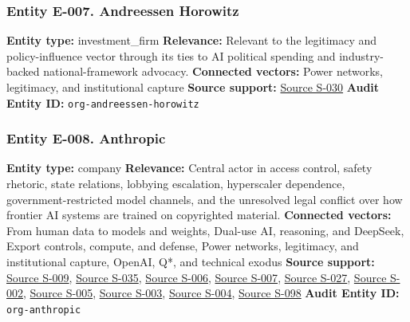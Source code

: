 \documentclass[
  american,
  11pt,
  letterpaper,
]{article}
\begin{document}
\subsubsection{Entity E-007. Andreessen
Horowitz}\label{entity-e-007-andreessen-horowitz}

\textbf{Entity type:} investment\_firm \textbf{Relevance:} Relevant to
the legitimacy and policy-influence vector through its ties to AI
political spending and industry-backed national-framework advocacy.
\textbf{Connected vectors:} Power networks, legitimacy, and
institutional capture \textbf{Source support:}
\hyperref[source-s-030-openai-linked-pac-doubles-down-in-kentucky]{Source
S-030} \textbf{Audit Entity ID:} \texttt{org-andreessen-horowitz}

\subsubsection{Entity E-008. Anthropic}\label{entity-e-008-anthropic}

\textbf{Entity type:} company \textbf{Relevance:} Central actor in
access control, safety rhetoric, state relations, lobbying escalation,
hyperscaler dependence, government-restricted model channels, and the
unresolved legal conflict over how frontier AI systems are trained on
copyrighted material. \textbf{Connected vectors:} From human data to
models and weights, Dual-use AI, reasoning, and DeepSeek, Export
controls, compute, and defense, Power networks, legitimacy, and
institutional capture, OpenAI, Q*, and technical exodus \textbf{Source
support:}
\hyperref[source-s-009-anthropic-wins-ruling-on-ai-training-in-copyright-lawsuit-but-must-face-trial-on-pirated-books]{Source
S-009},
\hyperref[source-s-035-bartz-et-al-v-anthropic-pbc-order-on-fair-use]{Source
S-035},
\hyperref[source-s-006-anthropics-responsible-scaling-policy-version-30]{Source
S-006},
\hyperref[source-s-007-responsible-scaling-policy-version-3-0]{Source
S-007},
\hyperref[source-s-027-anthropic-outspends-openai-in-biggest-ever-lobbying-quarter]{Source
S-027},
\hyperref[source-s-002-amazon-and-anthropic-announce-strategic-collaboration-to-advance-generative-ai]{Source
S-002}, \hyperref[source-s-005-plans-pricing-claude-by-anthropic]{Source
S-005}, \hyperref[source-s-003-introducing-claude-4]{Source S-003},
\hyperref[source-s-004-claude-gov-models-for-u-s-national-security-customers]{Source
S-004},
\hyperref[source-s-098-anthropic-and-palantir-partner-to-bring-claude-ai-models-to-aws-for-u-s-government-intelligence-and-defense-operations]{Source
S-098} \textbf{Audit Entity ID:} \texttt{org-anthropic}
\end{document}
